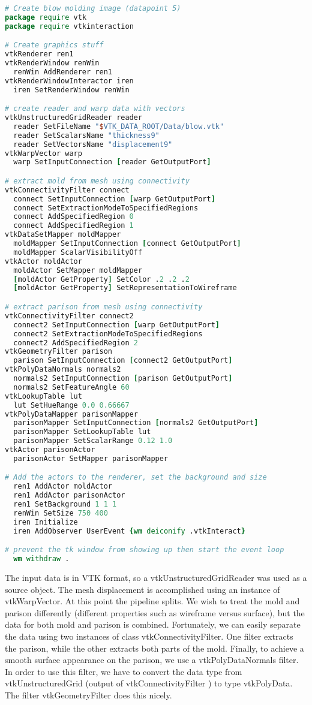 \begin{lstlisting}[language=TCL, caption={Script to generate the blow molding image.}]
# Create blow molding image (datapoint 5)
package require vtk
package require vtkinteraction

# Create graphics stuff
vtkRenderer ren1
vtkRenderWindow renWin
  renWin AddRenderer ren1
vtkRenderWindowInteractor iren
  iren SetRenderWindow renWin

# create reader and warp data with vectors
vtkUnstructuredGridReader reader
  reader SetFileName "$VTK_DATA_ROOT/Data/blow.vtk"
  reader SetScalarsName "thickness9"
  reader SetVectorsName "displacement9"
vtkWarpVector warp
  warp SetInputConnection [reader GetOutputPort]

# extract mold from mesh using connectivity
vtkConnectivityFilter connect
  connect SetInputConnection [warp GetOutputPort]
  connect SetExtractionModeToSpecifiedRegions
  connect AddSpecifiedRegion 0
  connect AddSpecifiedRegion 1
vtkDataSetMapper moldMapper
  moldMapper SetInputConnection [connect GetOutputPort]
  moldMapper ScalarVisibilityOff
vtkActor moldActor
  moldActor SetMapper moldMapper
  [moldActor GetProperty] SetColor .2 .2 .2
  [moldActor GetProperty] SetRepresentationToWireframe

# extract parison from mesh using connectivity
vtkConnectivityFilter connect2
  connect2 SetInputConnection [warp GetOutputPort]
  connect2 SetExtractionModeToSpecifiedRegions
  connect2 AddSpecifiedRegion 2
vtkGeometryFilter parison
  parison SetInputConnection [connect2 GetOutputPort]
vtkPolyDataNormals normals2
  normals2 SetInputConnection [parison GetOutputPort]
  normals2 SetFeatureAngle 60
vtkLookupTable lut
  lut SetHueRange 0.0 0.66667
vtkPolyDataMapper parisonMapper
  parisonMapper SetInputConnection [normals2 GetOutputPort]
  parisonMapper SetLookupTable lut
  parisonMapper SetScalarRange 0.12 1.0
vtkActor parisonActor
  parisonActor SetMapper parisonMapper

# Add the actors to the renderer, set the background and size
  ren1 AddActor moldActor
  ren1 AddActor parisonActor
  ren1 SetBackground 1 1 1
  renWin SetSize 750 400
  iren Initialize
  iren AddObserver UserEvent {wm deiconify .vtkInteract}

# prevent the tk window from showing up then start the event loop
  wm withdraw .
\end{lstlisting}

The input data is in VTK format, so a vtkUnstructuredGridReader was used as a source object. The mesh displacement is accomplished using an instance of vtkWarpVector. At this point the pipeline splits. We wish to treat the mold and parison differently (different properties such as wireframe versus surface), but the data for both mold and parison is combined. Fortunately, we can easily separate the data using two instances of class vtkConnectivityFilter. One filter extracts the parison, while the other extracts both parts of the mold. Finally, to achieve a smooth surface appearance on the parison, we use a vtkPolyDataNormals filter. In order to use this filter, we have to convert the data type from vtkUnstructuredGrid (output of vtkConnectivityFilter ) to type vtkPolyData. The filter vtkGeometryFilter does this nicely.

